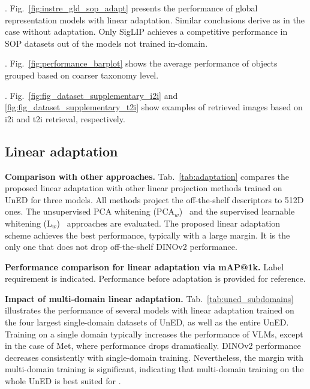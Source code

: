 . Fig.~\ref{fig:instre_gld_sop_adapt} presents the performance of global representation models with linear adaptation. Similar conclusions derive as in the case without adaptation. Only SigLIP achieves a competitive performance in SOP datasets out of the models not trained in-domain.

. Fig.~\ref{fig:performance_barplot} shows the average performance of objects grouped based on coarser taxonomy level.

. Fig.~\ref{fig:fig_dataset_supplementary_i2i} and \ref{fig:fig_dataset_supplementary_t2i} show examples of retrieved images based on i2i and t2i retrieval, respectively.


\subsection{Linear adaptation}

\noindent\textbf{Comparison with other approaches.}
Tab.~\ref{tab:adaptation} compares the proposed linear adaptation with other linear projection methods trained on UnED for three models. 
All methods project the off-the-shelf descriptors to 512D ones.
The unsupervised PCA whitening (PCA$_w$)~\cite{jc12} and the supervised learnable whitening (L$_w$)~\cite{rtc19} approaches are evaluated. 
The proposed linear adaptation scheme achieves the best performance, typically with a large margin. It is the only one that does not drop off-the-shelf DINOv2 performance.

\begin{table}[t]
  \centering
  
  \vspace{-7pt}
  \caption{\textbf{Performance comparison for linear adaptation via mAP@1k.} Label requirement is indicated. Performance before adaptation is provided for reference.
  \vspace{-7pt}
  \label{tab:adaptation}}
\end{table}

\noindent\textbf{Impact of multi-domain linear adaptation.}
Tab.~\ref{tab:uned_subdomains} illustrates the performance of several models with linear adaptation trained on the four largest single-domain datasets of UnED, as well as the entire UnED. Training on a single domain typically increases the performance of VLMs, except in the case of Met, where performance drops dramatically. DINOv2 performance decreases consistently with single-domain training. Nevertheless, the margin with multi-domain training is significant, indicating that multi-domain training on the whole UnED is best suited for \ours.

